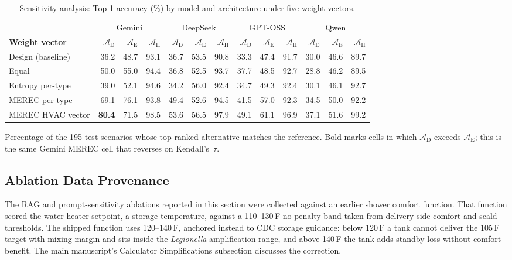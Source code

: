 \documentclass[11pt]{article}
\begin{document}
\begin{table}[htbp]
\centering
\footnotesize
\centering
\renewcommand{\arraystretch}{1.10}
\setlength{\tabcolsep}{4pt}
\caption{Sensitivity analysis: Top-1 accuracy (\%) by model and architecture under five weight vectors.}
\label{tab:sensitivity_top1}
\begin{tabular}{@{}l rrr rrr rrr rrr@{}}
\toprule
 & \multicolumn{3}{c}{Gemini} & \multicolumn{3}{c}{DeepSeek} & \multicolumn{3}{c}{GPT-OSS} & \multicolumn{3}{c}{Qwen} \\
\cmidrule(lr){2-4}\cmidrule(lr){5-7}\cmidrule(lr){8-10}\cmidrule(lr){11-13}
\textbf{Weight vector} & $\mathcal{A}_{\text{D}}$ & $\mathcal{A}_{\text{E}}$ & $\mathcal{A}_{\text{H}}$ & $\mathcal{A}_{\text{D}}$ & $\mathcal{A}_{\text{E}}$ & $\mathcal{A}_{\text{H}}$ & $\mathcal{A}_{\text{D}}$ & $\mathcal{A}_{\text{E}}$ & $\mathcal{A}_{\text{H}}$ & $\mathcal{A}_{\text{D}}$ & $\mathcal{A}_{\text{E}}$ & $\mathcal{A}_{\text{H}}$ \\
\midrule
Design (baseline)  & 36.2 & 48.7 & 93.1 & 36.7 & 53.5 & 90.8 & 33.3 & 47.4 & 91.7 & 30.0 & 46.6 & 89.7 \\
Equal              & 50.0 & 55.0 & 94.4 & 36.8 & 52.5 & 93.7 & 37.7 & 48.5 & 92.7 & 28.8 & 46.2 & 89.5 \\
\midrule
Entropy per-type   & 39.0 & 52.1 & 94.6 & 34.2 & 56.0 & 92.4 & 34.7 & 49.3 & 92.4 & 30.1 & 46.1 & 92.7 \\
\midrule
MEREC per-type     & 69.1 & 76.1 & 93.8 & 49.4 & 52.6 & 94.5 & 41.5 & 57.0 & 92.3 & 34.5 & 50.0 & 92.2 \\
MEREC HVAC vector  & \textbf{80.4} & 71.5 & 98.5 & 53.6 & 56.5 & 97.9 & 49.1 & 61.1 & 96.9 & 37.1 & 51.6 & 99.2 \\
\bottomrule
\end{tabular}
\renewcommand{\arraystretch}{1.0}
\setlength{\tabcolsep}{6pt}
\end{table}

Percentage of the 195 test scenarios whose top-ranked alternative matches
the reference. Bold marks cells in which $\mathcal{A}_{\text{D}}$ exceeds
$\mathcal{A}_{\text{E}}$; this is the same Gemini MEREC cell that reverses
on Kendall's~$\tau$.

\subsection{Ablation Data Provenance}
\label{app:ablation_provenance}

The RAG and prompt-sensitivity ablations reported in this section were collected against an earlier shower comfort function. That function scored the water-heater setpoint, a storage temperature, against a 110--130\,\textdegree{}F no-penalty band taken from delivery-side comfort and scald thresholds. The shipped function uses 120--140\,\textdegree{}F, anchored instead to CDC storage guidance: below 120\,\textdegree{}F a tank cannot deliver the 105\,\textdegree{}F target with mixing margin and sits inside the \textit{Legionella} amplification range, and above 140\,\textdegree{}F the tank adds standby loss without comfort benefit. The main manuscript's Calculator Simplifications subsection discusses the correction.
\end{document}
